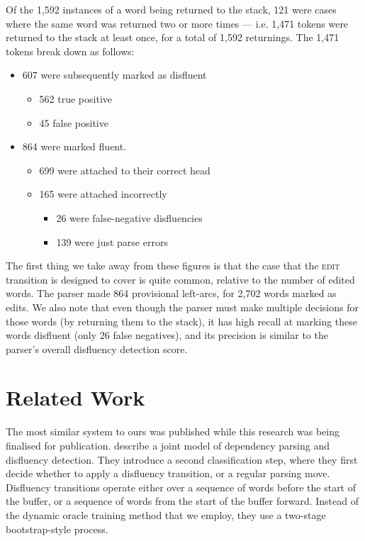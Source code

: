\documentclass[11pt,letterpaper]{article}
\newcommand{\edittrans}{\textsc{edit}\xspace}
\begin{document}
Of the 1,592 instances of a word being returned to the stack, 121 were cases where
the same word was returned two or more times --- i.e. 1,471 tokens were returned
to the stack at least once, for a total of 1,592 returnings.
The 1,471 tokens break down as follows:
\vspace*{-0.5em}
\begin{itemize}
    \itemsep0ex
    \item 607 were subsequently marked as disfluent
        \begin{itemize}
            \itemsep0ex
            \item 562 true positive
            \item 45 false positive
        \end{itemize}
    \item 864 were marked fluent.
        \begin{itemize}
            \itemsep0ex
            \item 699 were attached to their correct head
            \item 165 were attached incorrectly
            \begin{itemize}
                \itemsep0ex
                \item 26 were false-negative disfluencies
                \item 139 were just parse errors
            \end{itemize}
        \end{itemize}
\end{itemize}

The first thing we take away from these figures is that the case that the \edittrans
transition is designed to cover is quite common, relative to the number of edited
words.  The parser made 864 provisional left-arcs, for 2,702 words marked as 
edits.  We also note that even though the parser must make multiple decisions for
those words (by returning them to the stack), it has high recall at marking these
words disfluent (only 26 false negatives), and its precision is similar to
the parser's overall disfluency detection score.

\section{Related Work}

The most similar system to ours was published while this research was being
finalised for publication. \citet{rasooli:13} describe a joint model of dependency
parsing and disfluency detection. They introduce a second classification step,
where they first decide whether to apply a disfluency transition, or a regular
parsing move. Disfluency transitions operate either over a sequence of words
before the start of the buffer, or a sequence of words from the start of the
buffer forward. Instead of the dynamic oracle training method that we employ,
they use a two-stage bootstrap-style process.
\end{document}

